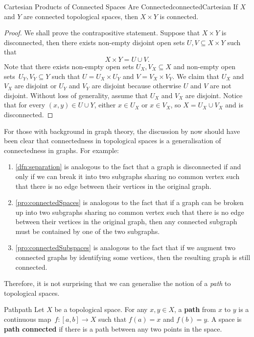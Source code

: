 \documentclass[math]{amznotes}
\theoremstyle{remark}
\begin{document}
\begin{probox}{Cartesian Products of Connected Spaces Are Connected}{connectedCartesian}
    If $X$ and $Y$ are connected topological spaces, then $X \times Y$ is connected.
    \tcblower
    \begin{proof}
        We shall prove the contrapositive statement. Suppose that $X \times Y$ is disconnected, then there exists non-empty disjoint open sets $U, V \subseteq X \times Y$ such that 
        \begin{equation*}
            X \times Y = U \cup V.
        \end{equation*}
        Note that there exists non-empty open sets $U_X, V_X \subseteq X$ and non-empty open sets~$U_Y, V_Y \subseteq Y$ such that $U = U_X \times U_Y$ and $V = V_X \times V_Y$. We claim that $U_X$ and $V_X$ are disjoint or $U_Y$ and $V_Y$ are disjoint because otherwise $U$ and $V$ are not disjoint. Without loss of generality, assume that $U_X$ and $V_X$ are disjoint. Notice that for every $\left(x, y\right) \in U \cup Y$, either $x \in U_X$ or $x \in V_X$, so $X = U_X \cup V_X$ and is disconnected.
    \end{proof}
\end{probox}
For those with background in graph theory, the discussion by now should have been clear that connectedness in topological spaces is a generalisation of connectedness in graphs. For example:
\begin{enumerate}
    \item \ref{dfn:separation} is analogous to the fact that a graph is disconnected if and only if we can break it into two subgraphs sharing no common vertex such that there is no edge between their vertices in the original graph.   
    \item \ref{pro:connectedSpaces} is analogous to the fact that if a graph can be broken up into two subgraphs sharing no common vertex such that there is no edge between their vertices in the original graph, then any connected subgraph must be contained by one of the two subgraphs.
    \item \ref{pro:connectedSubspaces} is analogous to the fact that if we augment two connected graphs by identifying some vertices, then the resulting graph is still connected.
\end{enumerate}
Therefore, it is not surprising that we can generalise the notion of a \textit{path} to topological spaces.
\begin{dfnbox}{Path}{path}
    Let $X$ be a topological space. For any $x, y \in X$, a {\color{red} \textbf{path}} from $x$ to $y$ is a continuous map~$f \colon \left[a, b\right] \to X$ such that $f\left(a\right) = x$ and $f\left(b\right) = y$. A space is {\color{red} \textbf{path connected}} if there is a path between any two points in the space.
\end{dfnbox}
\end{document}
